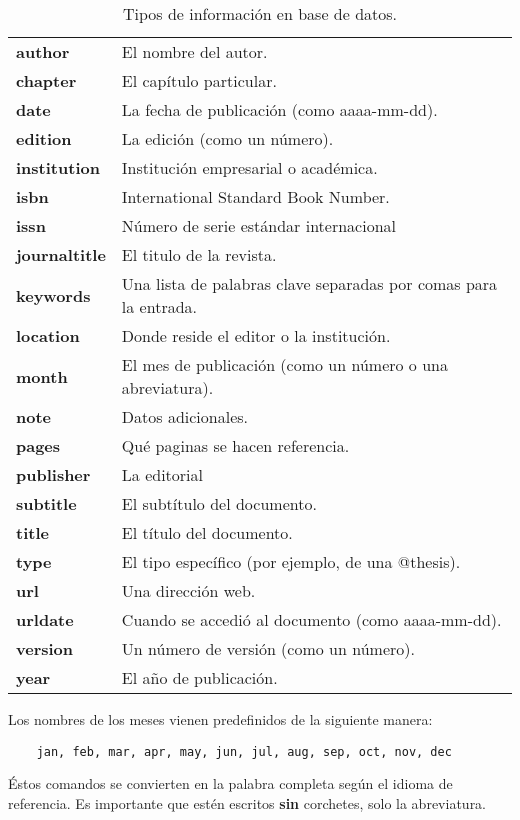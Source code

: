 \begin{table}[h]
	\centering
	\caption{Tipos de información en base de datos.}
	\begin{tabular}{ll}
		\toprule
		\textbf{author } & El nombre del autor. \\
		\textbf{chapter} & El capítulo particular. \\
		\textbf{date } & La fecha de publicación (como aaaa-mm-dd). \\
		\textbf{edition } & La edición (como un número). \\
		\textbf{institution } & Institución empresarial o académica. \\
		\textbf{isbn } & International Standard Book Number. \\
		\textbf{issn } & Número de serie estándar internacional \\
		\textbf{journaltitle } & El titulo de la revista. \\
		\textbf{keywords } & Una lista de palabras clave separadas por comas para la entrada. \\
		\textbf{location } & Donde reside el editor o la institución. \\
		\textbf{month } & El mes de publicación (como un número o una abreviatura). \\
		\textbf{note } & Datos adicionales. \\
		\textbf{pages } & Qué paginas se hacen referencia. \\
		\textbf{publisher } & La editorial \\
		\textbf{subtitle } & El subtítulo del documento. \\
		\textbf{title } & El título del documento. \\
		\textbf{type } & El tipo específico (por ejemplo, de una @thesis). \\
		\textbf{url } & Una dirección web. \\
		\textbf{urldate } & Cuando se accedió al documento (como aaaa-mm-dd). \\
		\textbf{version } & Un número de versión (como un número). \\
		\textbf{year } & El año de publicación. \\
		\bottomrule
	\end{tabular}%
	\label{tab:tipos_info}%
\end{table}%

Los nombres de los meses vienen predefinidos de la siguiente manera:
%
\begin{lstlisting}
	jan, feb, mar, apr, may, jun, jul, aug, sep, oct, nov, dec
\end{lstlisting}

Éstos comandos se convierten en la palabra completa según el idioma de referencia. Es importante que estén escritos \textbf{sin} corchetes, solo la abreviatura.

